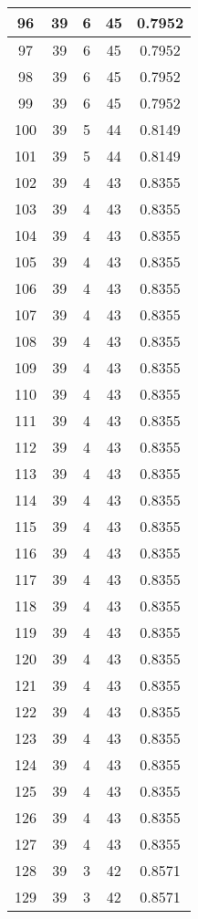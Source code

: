 \documentclass[letterpaper, 12pt]{article}
\begin{document}
\begin{longtable}{|c|c|c|c|c|}
\hline
96 & 39 & 6 & 45 & 0.7952 \\
\hline
97 & 39 & 6 & 45 & 0.7952 \\
\hline
98 & 39 & 6 & 45 & 0.7952 \\
\hline
99 & 39 & 6 & 45 & 0.7952 \\
\hline
100 & 39 & 5 & 44 & 0.8149 \\
\hline
101 & 39 & 5 & 44 & 0.8149 \\
\hline
102 & 39 & 4 & 43 & 0.8355 \\
\hline
103 & 39 & 4 & 43 & 0.8355 \\
\hline
104 & 39 & 4 & 43 & 0.8355 \\
\hline
105 & 39 & 4 & 43 & 0.8355 \\
\hline
106 & 39 & 4 & 43 & 0.8355 \\
\hline
107 & 39 & 4 & 43 & 0.8355 \\
\hline
108 & 39 & 4 & 43 & 0.8355 \\
\hline
109 & 39 & 4 & 43 & 0.8355 \\
\hline
110 & 39 & 4 & 43 & 0.8355 \\
\hline
111 & 39 & 4 & 43 & 0.8355 \\
\hline
112 & 39 & 4 & 43 & 0.8355 \\
\hline
113 & 39 & 4 & 43 & 0.8355 \\
\hline
114 & 39 & 4 & 43 & 0.8355 \\
\hline
115 & 39 & 4 & 43 & 0.8355 \\
\hline
116 & 39 & 4 & 43 & 0.8355 \\
\hline
117 & 39 & 4 & 43 & 0.8355 \\
\hline
118 & 39 & 4 & 43 & 0.8355 \\
\hline
119 & 39 & 4 & 43 & 0.8355 \\
\hline
120 & 39 & 4 & 43 & 0.8355 \\
\hline
121 & 39 & 4 & 43 & 0.8355 \\
\hline
122 & 39 & 4 & 43 & 0.8355 \\
\hline
123 & 39 & 4 & 43 & 0.8355 \\
\hline
124 & 39 & 4 & 43 & 0.8355 \\
\hline
125 & 39 & 4 & 43 & 0.8355 \\
\hline
126 & 39 & 4 & 43 & 0.8355 \\
\hline
127 & 39 & 4 & 43 & 0.8355 \\
\hline
128 & 39 & 3 & 42 & 0.8571 \\
\hline
129 & 39 & 3 & 42 & 0.8571 \\

\end{longtable}
\end{document}
